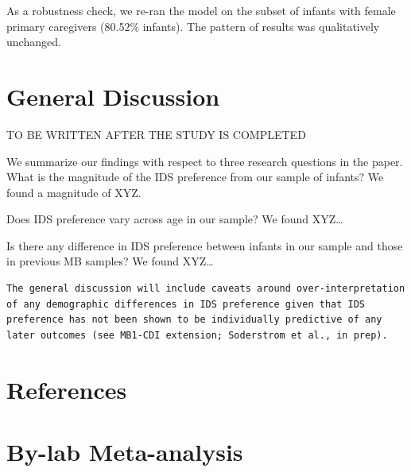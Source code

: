 \documentclass[
  ,man,floatsintext]{apa6}
\newlength{\cslhangindent}
\newlength{\cslentryspacingunit} %
\newenvironment{CSLReferences}[2] %
 {%
  \setlength{\parindent}{0pt}
  \ifodd #1
  \let\oldpar\par
  \def\par{\hangindent=\cslhangindent\oldpar}
  \fi
  \setlength{\parskip}{#2\cslentryspacingunit}
 }%
 {}
\begin{document}
As a robustness check, we re-ran the model on the subset of infants with female primary caregivers (80.52\% infants). The pattern of results was qualitatively unchanged.

\hypertarget{general-discussion}{%
\section{General Discussion}\label{general-discussion}}

TO BE WRITTEN AFTER THE STUDY IS COMPLETED

We summarize our findings with respect to three research questions in the paper.
What is the magnitude of the IDS preference from our sample of infants? We found a magnitude of XYZ.

Does IDS preference vary across age in our sample? We found XYZ\ldots{}

Is there any difference in IDS preference between infants in our sample and those in previous MB samples? We found XYZ\ldots{}

\begin{verbatim}
The general discussion will include caveats around over-interpretation of any demographic differences in IDS preference given that IDS preference has not been shown to be individually predictive of any later outcomes (see MB1-CDI extension; Soderstrom et al., in prep). 
\end{verbatim}

\newpage

\hypertarget{references}{%
\section{References}\label{references}}

\begingroup
\setlength{\parindent}{-0.5in}
\setlength{\leftskip}{0.5in}

\hypertarget{refs}{}
\begin{CSLReferences}{0}{0}
\end{CSLReferences}

\endgroup

\newpage

\newpage

\hypertarget{appendix-appendix}{%
\appendix}


\hypertarget{by-lab-meta-analysis}{%
\section{By-lab Meta-analysis}\label{by-lab-meta-analysis}}
\end{document}
